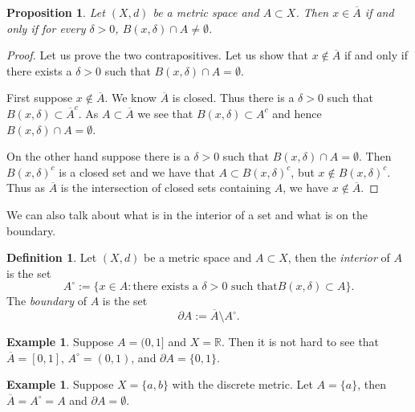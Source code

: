 \documentclass[12pt]{book}
\newcommand{\R}{{\mathbb{R}}}
\newcommand{\myindex}[1]{#1\index{#1}}
\theoremstyle{plain}
\newtheorem{prop}[thm]{Proposition}
\theoremstyle{remark}
\theoremstyle{definition}
\newtheorem{defn}[thm]{Definition}
\theoremstyle{exercise}
\theoremstyle{example}
\newtheorem{example}[thm]{Example}
\begin{document}
\begin{prop} \label{prop:msclosureappr}
Let $(X,d)$ be a metric space and $A \subset X$.  Then $x \in \overline{A}$
if and only if for every $\delta > 0$, $B(x,\delta) \cap A \not=\emptyset$.
\end{prop}

\begin{proof}
Let us prove the two contrapositives.
Let us show that $x \notin \overline{A}$ if and only if there exists
a $\delta > 0$ such that $B(x,\delta) \cap A = \emptyset$.

First suppose $x \notin \overline{A}$.  We know $\overline{A}$ is
closed.  Thus there is a $\delta > 0$ such that
$B(x,\delta) \subset \overline{A}^c$.  As $A \subset \overline{A}$ we
see that $B(x,\delta) \subset A^c$ and hence
$B(x,\delta) \cap A = \emptyset$.

On the other hand suppose there is a $\delta > 0$ such that
$B(x,\delta) \cap A = \emptyset$.  Then ${B(x,\delta)}^c$ is a closed set and we have
that $A \subset {B(x,\delta)}^c$, but
$x \notin {B(x,\delta)}^c$.  Thus as $\overline{A}$ is the intersection
of closed sets containing $A$, we have $x \notin \overline{A}$.
\end{proof}

We can also talk about what is in the interior of a set and what is on the
boundary.

\begin{defn}
Let $(X,d)$ be a metric space and $A \subset X$, then
the \emph{\myindex{interior}} of $A$ is the set
\begin{equation*}
A^\circ := \{ x \in A : \text{there exists a $\delta > 0$ such that
$B(x,\delta) \subset A$} \} .
\end{equation*}
The \emph{\myindex{boundary}} of $A$ is the set
\begin{equation*}
\partial A := \overline{A}\setminus A^\circ.
\end{equation*}
\end{defn}

\begin{example}
Suppose $A=(0,1]$ and $X = \R$.  Then it is not hard
to see that $\overline{A}=[0,1]$, $A^\circ = (0,1)$,
and $\partial A = \{ 0, 1 \}$.
\end{example}

\begin{example}
Suppose $X = \{ a, b \}$ with the discrete metric.
Let $A = \{ a \}$, then $\overline{A} = A^\circ = A$ and $\partial A =
\emptyset$.
\end{example}
\end{document}
